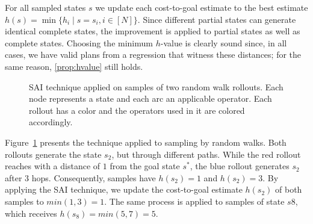 For all sampled states $s$ we update each cost-to-goal estimate to the best estimate $h(s) = \min\{h_i \mid s=s_i, i\in[N]\}$. Since different partial states can generate identical complete states, the improvement is applied to partial states as well as complete states. Choosing the minimum $h$-value is clearly sound since, in all cases, we have valid plans from a regression that witness these distances; for the same reason, \cref{prop:hvalue} still holds.

\begin{figure}[ht]
    \caption[SAI technique applied on samples of random walk rollouts.]{SAI technique applied on samples of two random walk rollouts. Each node represents a state and each arc an applicable operator. Each rollout has a color and the operators used in it are colored accordingly.}
    \label{fig:sai}
    \addvspace{\baselineskip}
    \centering
\end{figure}

Figure~\ref{fig:sai} presents the technique applied to sampling by random walks. Both rollouts generate the state $s_2$, but through different paths. While the red rollout reaches with a distance of $1$ from the goal state $s^*$, the blue rollout generates $s_2$ after $3$ hops. Consequently, samples have $h(s_2)=1$ and $h(s_2)=3$. By applying the SAI technique, we update the cost-to-goal estimate $h(s_2)$ of both samples to $min(1,3)=1$. The same process is applied to samples of state $s8$, which receives $h(s_8)=min(5,7)=5$.

